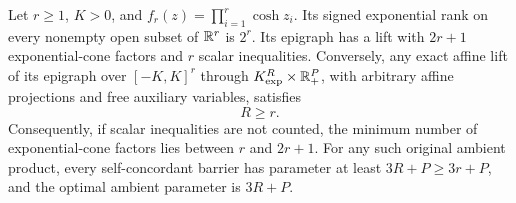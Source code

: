 \begin{theorem}
\label{thm:cosh-exp-count}
Let $r\geq1$, $K>0$, and
$f_r(z)=\prod_{i=1}^r\cosh z_i$. Its signed exponential rank on every
nonempty open subset of $\mathbb R^r$ is $2^r$. Its epigraph has a lift with
$2r+1$ exponential-cone factors and $r$ scalar inequalities. Conversely,
any exact affine lift of its epigraph over $[-K,K]^r$ through
$K_{\exp}^R\times\mathbb R_+^P$, with arbitrary affine projections and free
auxiliary variables, satisfies
\begin{equation}\label{eq:cosh-exp-sandwich}
 R\geq r.
\end{equation}
Consequently, if scalar inequalities are not counted, the minimum number
of exponential-cone factors lies between $r$ and $2r+1$. For any such
original ambient product, every
self-concordant barrier has parameter at least $3R+P\geq3r+P$, and the
optimal ambient parameter is $3R+P$.
\end{theorem}
